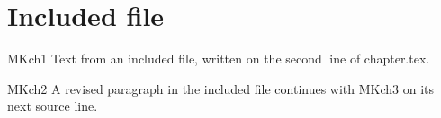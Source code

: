 \section{Included file}
MKch1 Text from an included file, written on the second line of chapter.tex.
\begin{REV}
MKch2 A revised paragraph in the included file
continues with MKch3 on its next source line.
\end{REV}
